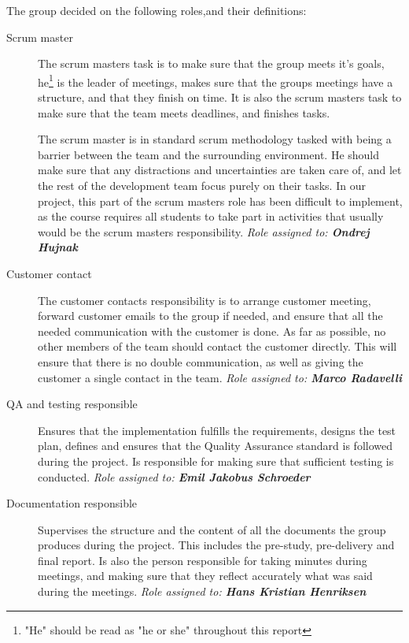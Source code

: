 \documentclass[11pt,a4paper,titlepage,oneside]{report}
\begin{document}
The group decided on the following roles,and their definitions:
\begin{description}
\item[Scrum master] The scrum masters task is to make sure that the group meets it's goals, he\footnote{"He" should be read as "he or she" throughout this report} is the leader of meetings, makes sure that the groups meetings have a structure, and that they finish on time. It is also the scrum masters task to make sure that the team meets deadlines, and finishes tasks. 

The scrum master is in standard scrum methodology tasked with being a barrier between the team and the surrounding environment. He should make sure that any distractions and uncertainties are taken care of, and let the rest of the development team focus purely on their tasks. In our project, this part of the scrum masters role has been difficult to implement, as the course requires all students to take part in activities that usually would be the scrum masters responsibility. 
\emph{Role assigned to: \textbf{Ondrej Hujnak}}

\item[Customer contact] The customer contacts responsibility is to arrange customer meeting, forward customer emails to the group if needed, and ensure that all the needed communication with the customer is done. As far as possible, no other members of the team should contact the customer directly. This will ensure that there is no double communication, as well as giving the customer a single contact in the team.
\emph{Role assigned to: \textbf{Marco Radavelli}}

\item[\gls{QA} and testing responsible] Ensures that the implementation fulfills the requirements, designs the test plan, defines and ensures that the Quality Assurance standard is followed during the project. Is responsible for making sure that sufficient testing is conducted.
\emph{Role assigned to: \textbf{Emil Jakobus Schroeder}}

\item[Documentation responsible] Supervises the structure and the content of all the documents the group produces during the project. This includes the \gls{pre-study}, \gls{pre-delivery} and final report. Is also the person responsible for taking minutes during meetings, and making sure that they reflect accurately what was said during the meetings.
\emph{Role assigned to: \textbf{Hans Kristian Henriksen}}


\end{description}
\end{document}
